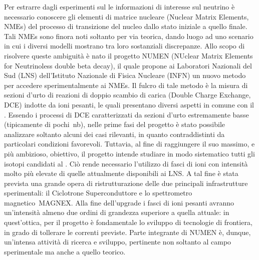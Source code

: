 Per estrarre dagli esperimenti sul \doppiobeta{} le informazioni di interesse sul neutrino è necessario conoscere gli elementi di matrice nucleare (Nuclear Matrix Elements, NMEs) del processo di transizione del nucleo dallo stato iniziale a quello finale. 
Tali NMEs sono finora noti soltanto per via teorica, dando luogo ad uno scenario in cui i diversi modelli mostrano tra loro sostanziali discrepanze.
Allo scopo di risolvere queste ambiguità è nato il progetto NUMEN (NUclear Matrix Elements for Neutrinoless double beta decay), il quale propone ai Laboratori Nazionali del Sud (LNS) dell'Istituto Nazionale di Fisica Nucleare (INFN) un nuovo metodo per accedere sperimentalmente ai NMEs.
Il fulcro di tale metodo è la misura di sezioni d'urto di reazioni di doppio scambio di carica (Double Charge Exchange, DCE) indotte da ioni pesanti, le quali presentano diversi aspetti in comune con il \doppiobeta.
Essendo i processi di DCE caratterizzati da sezioni d'urto estremamente basse (tipicamente di pochi~nb), nelle prime fasi del progetto è stato possibile analizzare soltanto alcuni dei casi rilevanti, in quanto contraddistinti da particolari condizioni favorevoli.
Tuttavia, al fine di raggiungere il suo massimo, e più ambizioso, obiettivo, il progetto intende studiare in modo sistematico tutti gli isotopi candidati al \doppiobeta{}.
Ciò rende necessario l'utilizzo di fasci di ioni con intensità molto più elevate di quelle attualmente disponibili ai LNS.
A tal fine è stata prevista una grande opera di ristrutturazione delle due principali infrastrutture sperimentali: il Ciclotrone Superconduttore e lo spettrometro magnetico~MAGNEX.
Alla fine dell'upgrade i fasci di ioni pesanti avranno un'intensità almeno due ordini di grandezza superiore a quella attuale: in quest'ottica, per il progetto è fondamentale lo sviluppo di tecnologie di frontiera, in grado di tollerare le correnti previste.
Parte integrante di NUMEN è, dunque, un'intensa attività di ricerca e sviluppo, pertinente non soltanto al campo sperimentale ma anche a quello teorico.


